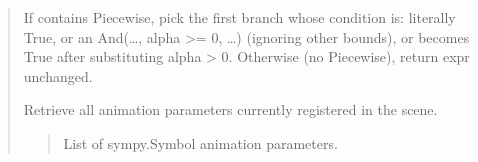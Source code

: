 \documentclass[letterpaper,10pt,english]{sphinxmanual}
\begin{document}
\begin{quote}
\begin{fulllineitems}
\begin{fulllineitems}
\begin{quote}
\begin{description}
\end{description}\end{quote}

\end{fulllineitems}


\begin{fulllineitems}
\label{\detokenize{pygeox:pygeox.animate.AnimateNamespace.eval_piecewise_at_zero}}
\pysigstartsignatures
\pysiglinewithargsret
{}
{\sphinxparamcomma {}}
{}
\pysigstopsignatures
\sphinxAtStartPar
If  contains Piecewise, pick the first branch whose condition is:
\sphinxhyphen{} literally True, or
\sphinxhyphen{} an And(…, alpha \textgreater{}= 0, …) (ignoring other bounds), or
\sphinxhyphen{} becomes True after substituting alpha \sphinxhyphen{}\textgreater{} 0.
Otherwise (no Piecewise), return expr unchanged.

\end{fulllineitems}


\begin{fulllineitems}
\label{\detokenize{pygeox:pygeox.animate.AnimateNamespace.get_time_params}}
\pysigstartsignatures
\pysiglinewithargsret
{}
{}
{}
\pysigstopsignatures
\sphinxAtStartPar
Retrieve all animation parameters currently registered in the scene.
\begin{quote}\begin{description}
\sphinxAtStartPar
List of sympy.Symbol animation parameters.

\end{description}\end{quote}

\end{fulllineitems}



\end{fulllineitems}
\end{quote}
\end{document}
